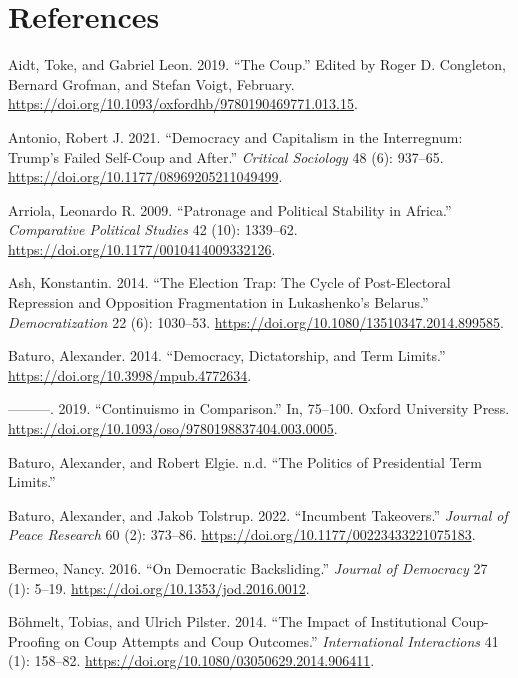 \documentclass[
  12pt,
]{report}
\newlength{\cslhangindent}
\newenvironment{CSLReferences}[2] %
 {\begin{list}{}{%
  \setlength{\itemindent}{0pt}
  \setlength{\leftmargin}{0pt}
  \setlength{\parsep}{0pt}
  \ifodd #1
   \setlength{\leftmargin}{\cslhangindent}
   \setlength{\itemindent}{-1\cslhangindent}
  \fi
  \setlength{\itemsep}{#2\baselineskip}}}
 {\end{list}}
\begin{document}
\chapter*{References}\label{references}

\label{refs}
\begin{CSLReferences}{1}{0}
Aidt, Toke, and Gabriel Leon. 2019. {``The Coup.''} Edited by Roger D.
Congleton, Bernard Grofman, and Stefan Voigt, February.
\url{https://doi.org/10.1093/oxfordhb/9780190469771.013.15}.

Antonio, Robert J. 2021. {``Democracy and Capitalism in the Interregnum:
Trump{'}s Failed Self-Coup and After.''} \emph{Critical Sociology} 48
(6): 937--65. \url{https://doi.org/10.1177/08969205211049499}.

Arriola, Leonardo R. 2009. {``Patronage and Political Stability in
Africa.''} \emph{Comparative Political Studies} 42 (10): 1339--62.
\url{https://doi.org/10.1177/0010414009332126}.

Ash, Konstantin. 2014. {``The Election Trap: The Cycle of Post-Electoral
Repression and Opposition Fragmentation in Lukashenko's Belarus.''}
\emph{Democratization} 22 (6): 1030--53.
\url{https://doi.org/10.1080/13510347.2014.899585}.

Baturo, Alexander. 2014. {``Democracy, Dictatorship, and Term Limits.''}
\url{https://doi.org/10.3998/mpub.4772634}.

---------. 2019. {``Continuismo in Comparison.''} In, 75--100. Oxford
University Press.
\url{https://doi.org/10.1093/oso/9780198837404.003.0005}.

Baturo, Alexander, and Robert Elgie. n.d. {``The Politics of
Presidential Term Limits.''}

Baturo, Alexander, and Jakob Tolstrup. 2022. {``Incumbent Takeovers.''}
\emph{Journal of Peace Research} 60 (2): 373--86.
\url{https://doi.org/10.1177/00223433221075183}.

Bermeo, Nancy. 2016. {``On Democratic Backsliding.''} \emph{Journal of
Democracy} 27 (1): 5--19. \url{https://doi.org/10.1353/jod.2016.0012}.

Böhmelt, Tobias, and Ulrich Pilster. 2014. {``The Impact of
Institutional Coup-Proofing on Coup Attempts and Coup Outcomes.''}
\emph{International Interactions} 41 (1): 158--82.
\url{https://doi.org/10.1080/03050629.2014.906411}.


\end{CSLReferences}
\end{document}
